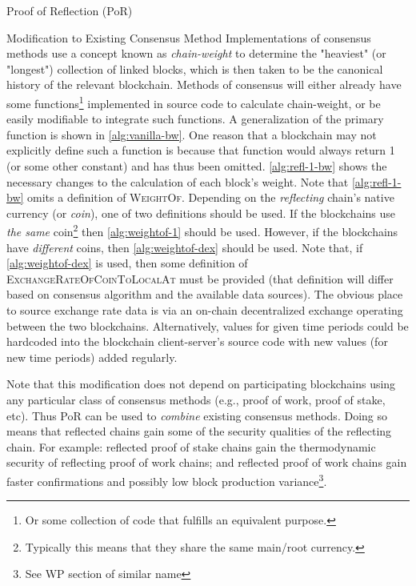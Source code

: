 \documentclass[a4paper,]{article}
\begin{document}
\begin{section}{Proof of Reflection (PoR)}
\begin{subsection}{Modification to Existing Consensus Method}
     Implementations of consensus methods use a concept known as \emph{chain-weight} to determine the "heaviest" (or "longest") collection of linked blocks, which is then taken to be the canonical history of the relevant blockchain.
     Methods of consensus will either already have some functions\footnote{Or some collection of code that fulfills an equivalent purpose.} implemented in source code to calculate chain-weight, or be easily modifiable to integrate such functions.
     A generalization of the primary function is shown in \autoref{alg:vanilla-bw}.
     One reason that a blockchain may not explicitly define such a function is because that function would always return 1 (or some other constant) and has thus been omitted.
     \autoref{alg:refl-1-bw} shows the necessary changes to the calculation of each block's weight.
     Note that \autoref{alg:refl-1-bw} omits a definition of \textsc{WeightOf}.
     Depending on the \emph{reflecting} chain's native currency (or \emph{coin}), one of two definitions should be used. If the blockchains use \emph{the same} coin\footnote{Typically this means that they share the same main/root currency.} then \autoref{alg:weightof-1} should be used.
     However, if the blockchains have \emph{different} coins, then \autoref{alg:weightof-dex} should be used.
     Note that, if \autoref{alg:weightof-dex} is used, then some definition of \textsc{ExchangeRateOfCoinToLocalAt} must be provided (that definition will differ based on consensus algorithm and the available data sources).
     The obvious place to source exchange rate data is via an on-chain decentralized exchange operating between the two blockchains.
     Alternatively, values for given time periods could be hardcoded into the blockchain client-server's source code with new values (for new time periods) added regularly.

    Note that this modification does not depend on participating blockchains using any particular class of consensus methods (e.g., proof of work, proof of stake, etc). Thus PoR can be used to \emph{combine} existing consensus methods. Doing so means that reflected chains gain some of the security qualities of the reflecting chain. For example: reflected proof of stake chains gain the thermodynamic security of reflecting proof of work chains; and reflected proof of work chains gain faster confirmations and possibly low block production variance\footnote{See WP section of similar name}.


\end{subsection}
\end{section}
\end{document}

